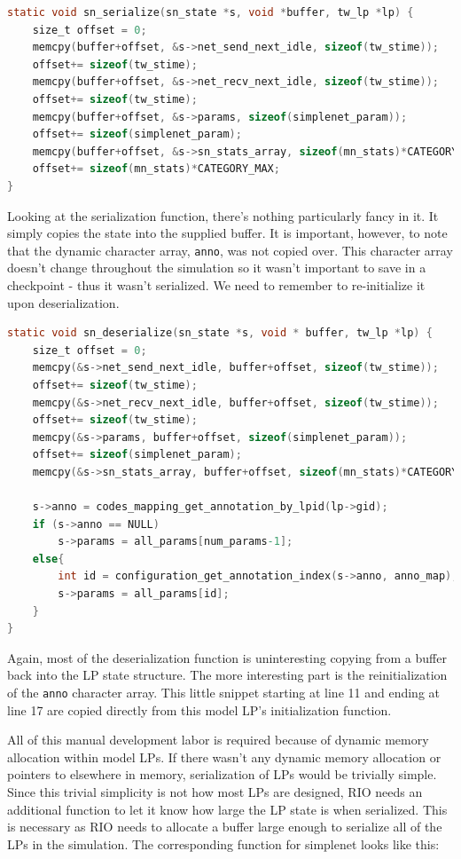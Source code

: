 \documentclass[letterpaper, 11 pt, conference]{IEEEtran}
\begin{document}
\begin{lstlisting}[language=C]
static void sn_serialize(sn_state *s, void *buffer, tw_lp *lp) {
	size_t offset = 0;
	memcpy(buffer+offset, &s->net_send_next_idle, sizeof(tw_stime));
	offset+= sizeof(tw_stime);
	memcpy(buffer+offset, &s->net_recv_next_idle, sizeof(tw_stime));
	offset+= sizeof(tw_stime);
	memcpy(buffer+offset, &s->params, sizeof(simplenet_param));
	offset+= sizeof(simplenet_param);
	memcpy(buffer+offset, &s->sn_stats_array, sizeof(mn_stats)*CATEGORY_MAX);
	offset+= sizeof(mn_stats)*CATEGORY_MAX;
}
\end{lstlisting}

Looking at the serialization function, there's nothing particularly fancy in it. It simply copies the state into the supplied buffer. It is important, however, to note that the dynamic character array, \texttt{anno}, was not copied over. This character array doesn't change throughout the simulation so it wasn't important to save in a checkpoint - thus it wasn't serialized. We need to remember to re-initialize it upon deserialization.

\begin{lstlisting}[language=C]
static void sn_deserialize(sn_state *s, void * buffer, tw_lp *lp) {
	size_t offset = 0;
	memcpy(&s->net_send_next_idle, buffer+offset, sizeof(tw_stime));
	offset+= sizeof(tw_stime);
	memcpy(&s->net_recv_next_idle, buffer+offset, sizeof(tw_stime));
	offset+= sizeof(tw_stime);
	memcpy(&s->params, buffer+offset, sizeof(simplenet_param));
	offset+= sizeof(simplenet_param);
	memcpy(&s->sn_stats_array, buffer+offset, sizeof(mn_stats)*CATEGORY_MAX);
	
	s->anno = codes_mapping_get_annotation_by_lpid(lp->gid);
	if (s->anno == NULL)
		s->params = all_params[num_params-1];
	else{
		int id = configuration_get_annotation_index(s->anno, anno_map);
		s->params = all_params[id];
	}
}
\end{lstlisting}

Again, most of the deserialization function is uninteresting copying from a buffer back into the LP state structure. The more interesting part is the reinitialization of the \texttt{anno} character array. This little snippet starting at line 11 and ending at line 17 are copied directly from this model LP's initialization function.

All of this manual development labor is required because of dynamic memory allocation within model LPs. If there wasn't any dynamic memory allocation or pointers to elsewhere in memory, serialization of LPs would be trivially simple. Since this trivial simplicity is not how most LPs are designed, RIO needs an additional function to let it know how large the LP state is when serialized. This is necessary as RIO needs to allocate a buffer large enough to serialize all of the LPs in the simulation. The corresponding function for simplenet looks like this:
\end{document}
